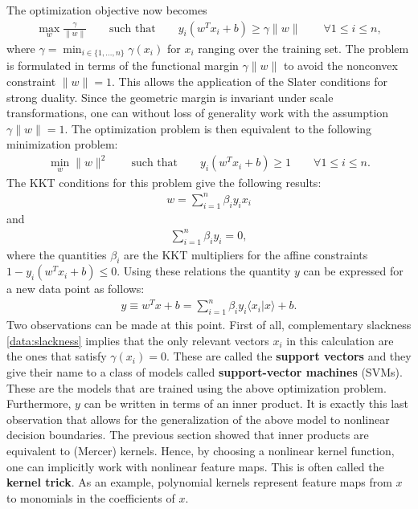     The optimization objective now becomes
    \begin{gather}
        \max_w\frac{\gamma}{\|w\|} \qquad\text{such that}\qquad  y_i(w^Tx_i+b)\geq\gamma\|w\|\qquad\forall 1\leq i\leq n,
    \end{gather}
    where $\gamma=\min_{i\in\{1,\ldots,n\}}\gamma(x_i)$ for $x_i$ ranging over the training set. The problem is formulated in terms of the functional margin $\gamma\|w\|$ to avoid the nonconvex constraint $\|w\|=1$. This allows the application of the Slater conditions for strong duality. Since the geometric margin is invariant under scale transformations, one can without loss of generality work with the assumption $\gamma\|w\|=1$. The optimization problem is then equivalent to the following minimization problem:
    \begin{gather}
        \min_w\|w\|^2 \qquad\text{such that}\qquad y_i(w^Tx_i+b)\geq1\qquad\forall 1\leq i\leq n.
    \end{gather}
    The KKT conditions for this problem give the following results:
    \begin{gather}
        w = \sum_{i=1}^n\beta_iy_ix_i
    \end{gather}
    and
    \begin{gather}
        \sum_{i=1}^n\beta_iy_i = 0,
    \end{gather}
    where the quantities $\beta_i$ are the KKT multipliers for the affine constraints $1-y_i(w^Tx_i+b)\leq0$. Using these relations the quantity $y$ can be expressed for a new data point as follows:
    \begin{gather}
        y \equiv w^Tx + b = \sum_{i=1}^n\beta_iy_i\langle x_i|x \rangle + b.
    \end{gather}
    Two observations can be made at this point. First of all, complementary slackness \ref{data:slackness} implies that the only relevant vectors $x_i$ in this calculation are the ones that satisfy $\gamma(x_i)=0$. These are called the \textbf{support vectors} and they give their name to a class of models called \textbf{support-vector machines} (SVMs). These are the models that are trained using the above optimization problem. Furthermore, $y$ can be written in terms of an inner product. It is exactly this last observation that allows for the generalization of the above model to nonlinear decision boundaries. The previous section showed that inner products are equivalent to (Mercer) kernels. Hence, by choosing a nonlinear kernel function, one can implicitly work with nonlinear feature maps. This is often called the \textbf{kernel trick}. As an example, polynomial kernels represent feature maps from $x$ to monomials in the coefficients of $x$.


